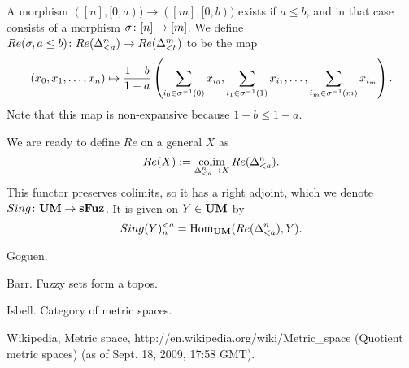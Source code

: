 \documentclass{amsart}
\def\UM{{\bf UM}}
\def\sFuz{{\bf sFuz}}
\begin{document}
A morphism $([n],[0,a))\to ([m],[0,b))$ exists if $a\leq b$, and in that case consists of a morphism $\sigma\colon [n]\rightarrow[m]$.  We define $Re(\sigma,a\leq b)\colon Re(\Delta^n_{<a})\rightarrow Re(\Delta^m_{<b})$ to be the map $$(x_0,x_1,\ldots,x_n)\mapsto \frac{1-b}{1-a}\left(\sum_{i_0\in\sigma^\m1(0)}x_{i_0},\sum_{i_1\in\sigma^\m1(1)}x_{i_1},\ldots,\sum_{i_m\in\sigma^\m1(m)}x_{i_m}\right).$$  Note that this map is non-expansive because $1-b\leq 1-a$.

We are ready to define $Re$ on a general $X$ as $$Re(X):=\mathop{\textnormal{colim}}_{\Delta^n_{<a}\rightarrow X}Re(\Delta^n_{<a}).$$  This functor preserves colimits, so it has a right adjoint, which we denote $Sing\taking\UM\to\sFuz$.  It is given on $Y\in\UM$ by $$Sing(Y)_n^{<a}=\Hom_\UM(Re(\Delta^n_{<a}),Y).$$


\begin{thebibliography}{JTT}

Goguen.

Barr. Fuzzy sets form a topos.

Isbell.  Category of metric spaces.

Wikipedia, Metric space, http://en.wikipedia.org/wiki/Metric\_space (Quotient metric spaces) (as of Sept. 18, 2009, 17:58 GMT).

\end{thebibliography}
\end{document}
